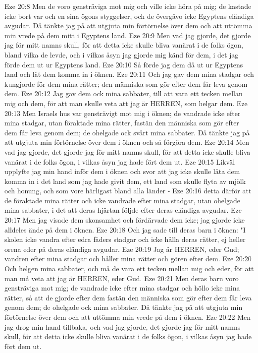 Eze 20:8  Men de voro gensträviga mot mig och ville icke höra på mig; de kastade icke bort var och en sina ögons styggelser, och de övergåvo icke Egyptens eländiga avgudar. Då tänkte jag på att utgjuta min förtörnelse över dem och att uttömma min vrede på dem mitt i Egyptens land.
Eze 20:9  Men vad jag gjorde, det gjorde jag för mitt namns skull, för att detta icke skulle bliva vanärat i de folks ögon, bland vilka de levde, och i vilkas åsyn jag gjorde mig känd för dem, i det jag förde dem ut ur Egyptens land.
Eze 20:10  Så förde jag dem då ut ur Egyptens land och lät dem komma in i öknen.
Eze 20:11  Och jag gav dem mina stadgar och kungjorde för dem mina rätter; den människa som gör efter dem får leva genom dem.
Eze 20:12  Jag gav dem ock mina sabbater, till att vara ett tecken mellan mig och dem, för att man skulle veta att jag är HERREN, som helgar dem.
Eze 20:13  Men Israels hus var gensträvigt mot mig i öknen; de vandrade icke efter mina stadgar, utan föraktade mina rätter, fastän den människa som gör efter dem får leva genom dem; de ohelgade ock svårt mina sabbater. Då tänkte jag på att utgjuta min förtörnelse över dem i öknen och så förgöra dem.
Eze 20:14  Men vad jag gjorde, det gjorde jag för mitt namns skull, för att detta icke skulle bliva vanärat i de folks ögon, i vilkas åsyn jag hade fört dem ut.
Eze 20:15  Likväl upplyfte jag min hand inför dem i öknen och svor att jag icke skulle låta dem komma in i det land som jag hade givit dem, ett land som skulle flyta av mjölk och honung, och som vore härligast bland alla länder -
Eze 20:16  detta därför att de föraktade mina rätter och icke vandrade efter mina stadgar, utan ohelgade mina sabbater, i det att deras hjärtan följde efter deras eländiga avgudar.
Eze 20:17  Men jag visade dem skonsamhet och fördärvade dem icke; jag gjorde icke alldeles ände på dem i öknen.
Eze 20:18  Och jag sade till deras barn i öknen: "I skolen icke vandra efter edra fäders stadgar och icke hålla deras rätter, ej heller orena eder på deras eländiga avgudar.
Eze 20:19  Jag är HERREN, eder Gud; vandren efter mina stadgar och håller mina rätter och gören efter dem.
Eze 20:20  Och helgen mina sabbater, och må de vara ett tecken mellan mig och eder, för att man må veta att jag är HERREN, eder Gud.
Eze 20:21  Men deras barn voro gensträviga mot mig; de vandrade icke efter mina stadgar och höllo icke mina rätter, så att de gjorde efter dem fastän den människa som gör efter dem får leva genom dem; de ohelgade ock mina sabbater. Då tänkte jag på att utgjuta min förtörnelse över dem och att uttömma min vrede på dem i öknen.
Eze 20:22  Men jag drog min hand tillbaka, och vad jag gjorde, det gjorde jag för mitt namns skull, för att detta icke skulle bliva vanärat i de folks ögon, i vilkas åsyn jag hade fört dem ut.
